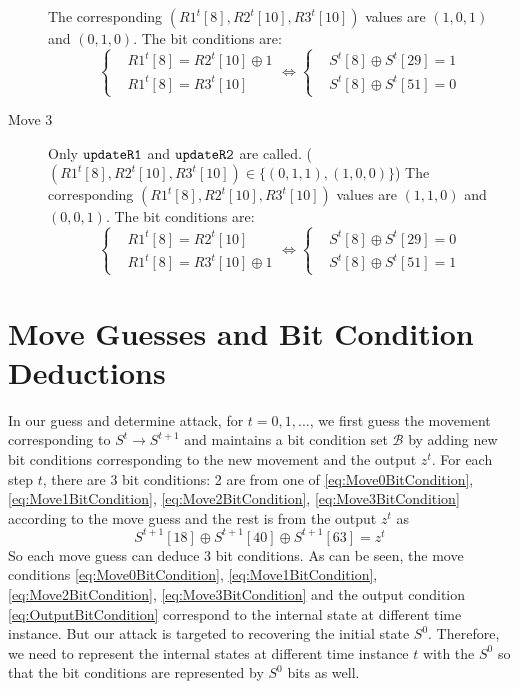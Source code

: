 \begin{description}
  The corresponding $(R1^t[8],R2^t[10],R3^t[10])$ values are $(1,0,1)$ and $(0,1,0)$.
  The bit conditions are:
  \begin{equation}\label{eq:Move2BitCondition}
    \left\{
    \begin{aligned}
    &R1^t[8]=R2^t[10]\oplus 1\\
    &R1^t[8]=R3^t[10]
    \end{aligned}
    \right.
    \Leftrightarrow
    \left\{
    \begin{aligned}
    &S^t[8]\oplus S^t[29]=1\\
    &S^t[8]\oplus S^t[51]=0
    \end{aligned}
    \right.
  \end{equation}
  \item[Move 3] Only $\tt{updateR1}$ and $\tt{updateR2}$ are called. ($(R1^t[8],R2^t[10],R3^t[10])\in \{(0,1,1),(1,0,0)\}$)
  The corresponding $(R1^t[8],R2^t[10],R3^t[10])$ values are $(1,1,0)$ and $(0,0,1)$.
  The bit conditions are:
  \begin{equation}\label{eq:Move3BitCondition}
    \left\{
    \begin{aligned}
    &R1^t[8]=R2^t[10]\\
    &R1^t[8]=R3^t[10]\oplus 1
    \end{aligned}
    \right.
    \Leftrightarrow
    \left\{
    \begin{aligned}
    &S^t[8]\oplus S^t[29]=0\\
    &S^t[8]\oplus S^t[51]=1
    \end{aligned}
    \right.
  \end{equation}
\end{description}

\section{Move Guesses and Bit Condition Deductions}
In our guess and determine attack, for $t=0,1,...$, we first guess the movement corresponding to $S^t\rightarrow S^{t+1}$ and maintains a bit condition set $\mathcal{B}$ by adding new bit conditions corresponding to the new movement and the output $z^t$. 
For each step $t$, there are 3 bit conditions: 2 are from one of \eqref{eq:Move0BitCondition}, \eqref{eq:Move1BitCondition}, \eqref{eq:Move2BitCondition}, \eqref{eq:Move3BitCondition} according to the move guess and the rest is from the output $z^t$ as
\begin{equation}\label{eq:OutputBitCondition}
S^{t+1}[18]\oplus S^{t+1}[40]\oplus S^{t+1}[63]=z^t
\end{equation}
So each move guess can deduce 3 bit conditions. 
As can be seen, the move conditions \eqref{eq:Move0BitCondition}, \eqref{eq:Move1BitCondition}, \eqref{eq:Move2BitCondition}, \eqref{eq:Move3BitCondition} and the output condition \eqref{eq:OutputBitCondition} correspond to the internal state at different time instance. 
But our attack is targeted to recovering the initial state $S^0$. 
Therefore, we need to represent the internal states at different time instance $t$ with the $S^0$ so that the bit conditions are represented by $S^0$ bits as well. 


